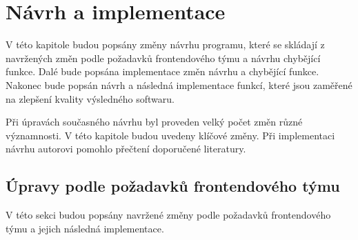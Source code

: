 \chapter{Návrh a implementace}\label{chapter:navrh}
V této kapitole budou popsány změny návrhu programu, které se skládají z navržených změn podle požadavků frontendového týmu a návrhu chybějící funkce. Dalé bude popsána implementace změn návrhu a chybějící funkce. Nakonec bude popsán návrh a následná implementace funkcí, které jsou zaměřené na zlepšení kvality výsledného softwaru.

Při úpravách současného návrhu byl proveden  velký počet změn různé významnosti. V této kapitole budou uvedeny klíčové změny. Při implementaci návrhu autorovi pomohlo přečtení doporučené literatury.\cite{pro-spring-boot-2}

\section{Úpravy podle požadavků frontendového týmu}\label{navrh:upravy}
    V této sekci budou popsány navržené změny podle požadavků frontendového týmu a jejich následná implementace.
    
